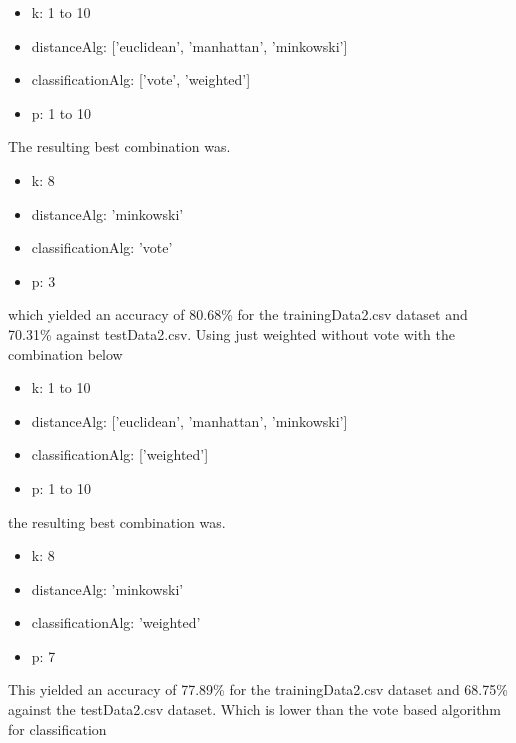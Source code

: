 \begin{itemize}
  \item k: 1 to 10
  \item distanceAlg: ['euclidean', 'manhattan', 'minkowski']
  \item classificationAlg: ['vote', 'weighted']
  \item p: 1 to 10
\end{itemize}

The resulting best combination was.

\begin{itemize}
  \item k: 8
  \item distanceAlg: 'minkowski'
  \item classificationAlg: 'vote'
  \item p: 3
\end{itemize}

which yielded an accuracy of 80.68\% for the trainingData2.csv dataset and 70.31\% against testData2.csv. Using just weighted without vote with the combination below

\begin{itemize}
  \item k: 1 to 10
  \item distanceAlg: ['euclidean', 'manhattan', 'minkowski']
  \item classificationAlg: ['weighted']
  \item p: 1 to 10
\end{itemize}

the resulting best combination was. 

\begin{itemize}
  \item k: 8
  \item distanceAlg: 'minkowski'
  \item classificationAlg: 'weighted'
  \item p: 7
\end{itemize}

This yielded an accuracy of 77.89\% for the trainingData2.csv dataset and 68.75\% against the testData2.csv dataset. Which is lower than the vote based algorithm for classification